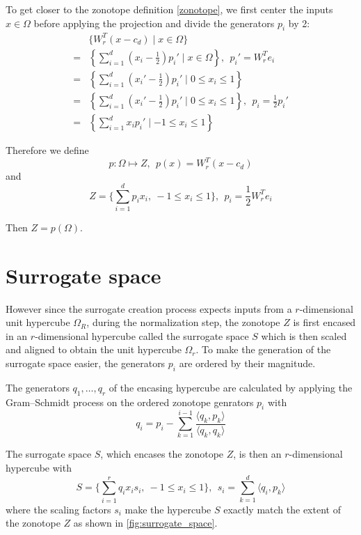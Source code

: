 \documentclass[
  a4paper,  %
  twoside,  %
  bibliography=totoc,
  headsepline,
  cleardoublepage=empty,
  parskip=half,
  draft=false
]{scrbook}
\begin{document}
To get closer to the zonotope definition \ref{zonotope}, we first center the inputs $x \in \Omega$ before applying the projection and divide the generators $p_i$ by 2:
\begin{equation}
\begin{split}
&\{W_r^T (x - c_d) \mid x \in \Omega\}\\
=&\left\{\sum_{i=1}^d (x_i - \frac{1}{2}) p_i' \mid x \in \Omega \right\}, ~~ p_i'=W_r^T e_i\\
=&\left\{\sum_{i=1}^d (x_i' - \frac{1}{2}) p_i' \mid 0 \leq x_i \leq 1 \right\}\\
=&\left\{\sum_{i=1}^d (x_i' - \frac{1}{2}) p_i' \mid 0 \leq x_i \leq 1 \right\}, ~~ p_i=\frac{1}{2} p_i'\\
=&\left\{\sum_{i=1}^d x_i p_i' \mid -1 \leq x_i \leq 1 \right\}
\end{split}
\end{equation}

Therefore we define
\begin{equation}
p \colon \Omega \mapsto Z, ~~ p(x)=W_r^T (x-c_d)
\end{equation}
and
\begin{equation}
Z=\{\sum_{i=1}^d p_i x_i , ~ -1 \leq x_i \leq 1\}, ~~ p_i=\frac{1}{2} W_r^T e_i
\end{equation}

Then $Z=p(\Omega)$.

\section{Surrogate space}

However since the surrogate creation process expects inputs from a $r$-dimensional unit hypercube $\Omega_R$, during the normalization step, the zonotope $Z$ is first encased in an $r$-dimensional hypercube called the surrogate space $S$ which is then scaled and aligned to obtain the unit hypercube $\Omega_r$.
To make the generation of the surrogate space easier, the generators $p_i$ are ordered by their magnitude.

The generators $q_1, \dots, q_r$ of the encasing hypercube are calculated by applying the Gram–Schmidt process on the ordered zonotope genrators $p_i$ with
\begin{equation}
q_i=p_i - \sum_{k=1}^{i-1} \frac{\langle q_k, p_k\rangle}{\langle q_k, q_k\rangle}
\nonumber
\end{equation}

The surrogate space $S$, which encases the zonotope $Z$, is then an $r$-dimensional hypercube with
\begin{equation}
S=\{\sum_{i=1}^r q_i x_i s_i , ~ -1 \leq x_i \leq 1\},~~ s_i=\sum_{k=1}^d \langle q_i, p_k\rangle
\label{surrogate_space}
\end{equation}
where the scaling factors $s_i$ make the hypercube $S$ exactly match the extent of the zonotope $Z$ as shown in \ref{fig:surrogate_space}.
\end{document}
